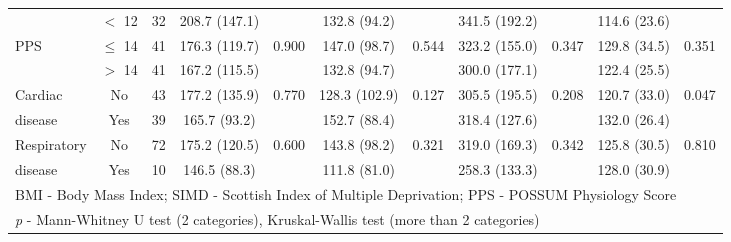 \begin{sidewaystable}[p]
\begin{tabular}{|l c c | c c| c c | c c | c c|}
		                          & $<$ 12    & 32 & 208.7 (147.1) &                       & 132.8 (94.2)  &                   & 341.5 (192.2) &                & 114.6 (23.6) &  \\
		PPS                       & $\leq$ 14 & 41 & 176.3 (119.7) & 0.900                 & 147.0 (98.7)  & 0.544             & 323.2 (155.0) & 0.347          & 129.8 (34.5) & 0.351                 \\
		                          & $>$ 14    & 41 & 167.2 (115.5) &                       & 132.8 (94.7)  &                   & 300.0 (177.1) &                & 122.4 (25.5) &  \\
		Cardiac                   & No        & 43 & 177.2 (135.9) & 0.770                 & 128.3 (102.9) & 0.127             & 305.5 (195.5) & 0.208          & 120.7 (33.0) & 0.047                 \\
		disease                   & Yes       & 39 & 165.7 (93.2)  &                       & 152.7 (88.4)  &                   & 318.4 (127.6) &                & 132.0 (26.4) &  \\
		Respiratory                     & No        & 72 & 175.2 (120.5) & 0.600                 & 143.8 (98.2)  & 0.321             & 319.0 (169.3) & 0.342          & 125.8 (30.5) & 0.810                 \\
		disease                   & Yes       & 10 & 146.5 (88.3)  &                       & 111.8 (81.0)  &                   & 258.3 (133.3) &                & 128.0 (30.9) &  \\ \hline
		\multicolumn{11}{l}{BMI - Body Mass Index; SIMD - Scottish Index of Multiple Deprivation; PPS - POSSUM Physiology Score}                                                                       \\
		\multicolumn{11}{l}{\textit{p} - Mann-Whitney U test (2 categories), Kruskal-Wallis test (more than 2 categories)}
	\end{tabular}
\end{sidewaystable}


























